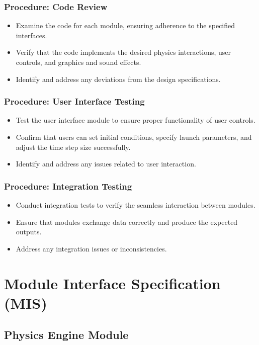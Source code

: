 \documentclass[12pt, titlepage]{article}
\begin{document}
\subsubsection*{Procedure: Code Review}
\begin{itemize}
  \item Examine the code for each module, ensuring adherence to the specified interfaces.
  \item Verify that the code implements the desired physics interactions, user controls, and graphics and sound effects.
  \item Identify and address any deviations from the design specifications.
\end{itemize}

\subsubsection*{Procedure: User Interface Testing}
\begin{itemize}
  \item Test the user interface module to ensure proper functionality of user controls.
  \item Confirm that users can set initial conditions, specify launch parameters, and adjust the time step size successfully.
  \item Identify and address any issues related to user interaction.
\end{itemize}

\subsubsection*{Procedure: Integration Testing}
\begin{itemize}
  \item Conduct integration tests to verify the seamless interaction between modules.
  \item Ensure that modules exchange data correctly and produce the expected outputs.
  \item Address any integration issues or inconsistencies.
\end{itemize}

\section{Module Interface Specification (MIS)}
\subsection{Physics Engine Module}
\end{document}
